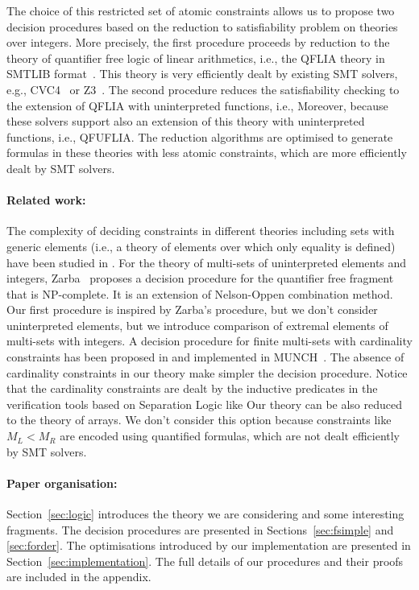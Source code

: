 The choice of this restricted set of atomic constraints allows us to propose two decision procedures based on the reduction to satisfiability problem on theories over integers. More precisely, the first procedure proceeds by reduction to the theory of quantifier free logic of linear arithmetics, i.e., the QFLIA theory in SMTLIB format~\cite{SMTLIB10}. This theory is very efficiently dealt by existing SMT solvers, e.g.,
CVC4~\cite{barrett2011cvc4} or Z3~\cite{de2008z3}.
The second procedure reduces the satisfiability checking to the extension of QFLIA with uninterpreted functions, i.e., Moreover, because these solvers support also an extension of this theory with uninterpreted functions, i.e., QFUFLIA.
The reduction algorithms are optimised to generate formulas in these theories with less atomic constraints, which are more efficiently dealt by SMT solvers.

\paragraph{Related work:}
The complexity of deciding constraints in different theories including sets with generic elements (i.e., a theory of elements over which only equality is defined) have been studied in \cite{DBLP:conf/csl/AikenKVW93,DBLP:journals/scp/OliveiraDF12}.
%
For the theory of multi-sets of uninterpreted elements and integers, Zarba~\cite{zarba2002combining} proposes a decision procedure for the quantifier free fragment that is NP-complete. It is an extension of Nelson-Oppen combination method. 
Our first procedure is inspired by Zarba's procedure, but we don't consider uninterpreted elements, but we introduce comparison of extremal elements of multi-sets with integers. 
%
A decision procedure for finite multi-sets with cardinality constraints has been proposed in \cite{DBLP:conf/csl/KuncakPS10} and implemented in MUNCH~\cite{DBLP:conf/cade/PiskacK10}. The absence of cardinality constraints in our theory make simpler the decision procedure. Notice that the cardinality constraints are dealt by the inductive predicates in the verification tools based on Separation Logic like \cite{EneaSW15,verifast}
%
Our theory can be also reduced to the theory of arrays. We don't consider this option because constraints like $M_L < M_R$ are encoded using quantified formulas, which are not dealt efficiently by SMT solvers.

\paragraph{Paper organisation:}
Section~\ref{sec:logic} introduces the theory we are considering and some interesting fragments. The decision procedures are presented in Sections~\ref{sec:fsimple} and \ref{sec:forder}.
The optimisations introduced by our implementation are presented in Section~\ref{sec:implementation}.
The full details of our procedures and their proofs are included in the appendix.

